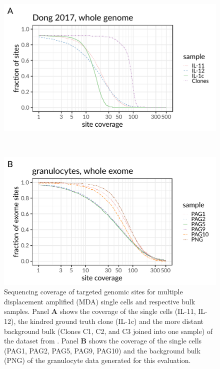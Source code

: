 \documentclass[authoryear,preprint,11pt]{scrartcl}
\begin{document}
\begin{figure}[!tpb]
 \begin{minipage}{.99\linewidth}
  \includegraphics[width=.99\linewidth]{figs/Dong2017/Dong2017_coverage_dist.pdf}
 \end{minipage} \\
 \begin{minipage}{.99\linewidth}
  \includegraphics[width=.99\linewidth]{figs/Laehnemann2017/Laehnemann2017_coverage_dist.pdf}
 \end{minipage}
 \caption{
 Sequencing coverage of targeted genomic sites for multiple displacement amplified (MDA) single cells and respective bulk samples.
 Panel \textbf{A} shows the coverage of the single cells (IL-11, IL-12), the kindred ground truth clone (IL-1c) and the more distant background bulk (Clones C1, C2, and C3 joined into one sample) of the dataset from \cite{dong_accurate_2017}.
 Panel \textbf{B} shows the coverage of the single cells (PAG1, PAG2, PAG5, PAG9, PAG10) and the background bulk (PNG) of the granulocyte data generated for this evaluation.
 }
 \label{fig:coverage-dists}
\end{figure}
\end{document}
